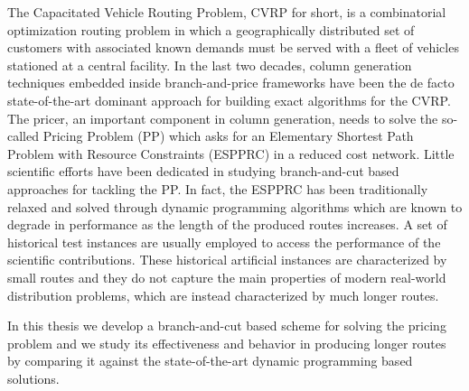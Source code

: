 \noindent The Capacitated Vehicle Routing Problem, CVRP for short,
is a combinatorial optimization routing problem in which
a geographically distributed set of
customers with associated known demands must be served with a fleet of vehicles
stationed at a central facility.
In the last two decades,
column generation techniques embedded inside branch-and-price frameworks
have been the de facto state-of-the-art dominant approach
for building exact algorithms for the CVRP.
The pricer, an important component in column generation, needs to solve
the so-called Pricing Problem (PP) which asks for an
Elementary Shortest Path Problem with Resource Constraints (ESPPRC)
in a reduced cost network.
Little scientific efforts have been dedicated in studying
branch-and-cut based approaches for tackling the PP.
In fact, the ESPPRC has been traditionally relaxed and solved through dynamic programming
algorithms which are known to degrade in performance as
the length of the produced routes increases.
A set of historical test instances are usually employed to access
the performance of the scientific contributions.
These historical artificial instances are characterized by small routes
and they do not capture the main properties of modern real-world distribution
problems,
which are instead characterized by much longer routes.

\noindent In this thesis we develop
a branch-and-cut based scheme for solving the pricing problem
and we study its effectiveness and behavior in producing longer routes
by comparing it against the state-of-the-art dynamic programming based solutions.
